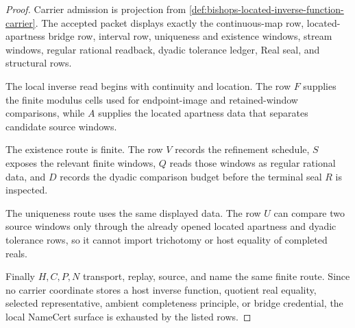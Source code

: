 \begin{proof}
Carrier admission is projection from \autoref{def:bishops-located-inverse-function-carrier}. The accepted packet displays exactly the continuous-map row, located-apartness bridge row, interval row, uniqueness and existence windows, stream windows, regular rational readback, dyadic tolerance ledger, Real seal, and structural rows.

The local inverse read begins with continuity and location. The row $F$ supplies the finite modulus cells used for endpoint-image and retained-window comparisons, while $A$ supplies the located apartness data that separates candidate source windows.

The existence route is finite. The row $V$ records the refinement schedule, $S$ exposes the relevant finite windows, $Q$ reads those windows as regular rational data, and $D$ records the dyadic comparison budget before the terminal seal $R$ is inspected.

The uniqueness route uses the same displayed data. The row $U$ can compare two source windows only through the already opened located apartness and dyadic tolerance rows, so it cannot import trichotomy or host equality of completed reals.

Finally $H,C,P,N$ transport, replay, source, and name the same finite route. Since no carrier coordinate stores a host inverse function, quotient real equality, selected representative, ambient completeness principle, or bridge credential, the local NameCert surface is exhausted by the listed rows.
\end{proof}


\begin{closurestatus}{\BishopLocatedInverseFunctionUp}
  \theoryclosure{\seedClosure}
  \formalstatus{\unformalizedV}
\end{closurestatus}

